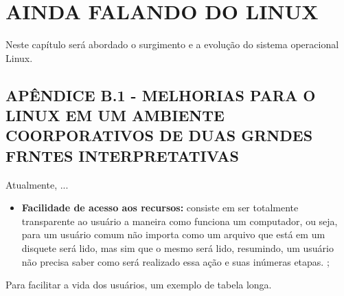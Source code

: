 \chapter{AINDA FALANDO DO LINUX}
\label{apb:linux}
\vspace{-2cm}

Neste capítulo será abordado o surgimento e a evolução do sistema operacional Linux.

\section*{\hspace{1.3cm}APÊNDICE B.1 - MELHORIAS PARA O LINUX EM UM AMBIENTE COORPORATIVOS DE DUAS GRNDES FRNTES INTERPRETATIVAS}
\label{secapb:linux}
Atualmente, ... 

\begin{itemize}
\item \textbf{Facilidade de acesso aos recursos:} consiste em ser totalmente transparente ao usuário a maneira como funciona um computador, ou seja, para um usuário comum  não importa como um arquivo que está em um disquete será lido, mas sim que o mesmo será lido, resumindo, um usuário  não precisa saber como será realizado essa ação e suas inúmeras etapas. \cite{machado};
\end{itemize}


Para facilitar a vida dos usuários, um exemplo de tabela longa.

